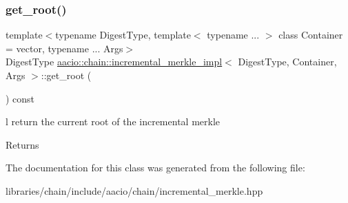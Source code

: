 \subsubsection{\texorpdfstring{get\+\_\+root()}{get\_root()}}
{\footnotesize\ttfamily template$<$typename Digest\+Type, template$<$ typename ... $>$ class Container = vector, typename ... Args$>$ \\
Digest\+Type \mbox{\hyperlink{classaacio_1_1chain_1_1incremental__merkle__impl}{aacio\+::chain\+::incremental\+\_\+merkle\+\_\+impl}}$<$ Digest\+Type, Container, Args $>$\+::get\+\_\+root (\begin{DoxyParamCaption}{ }\end{DoxyParamCaption}) const\hspace{0.3cm}{\ttfamily [inline]}}

l return the current root of the incremental merkle

\begin{DoxyReturn}{Returns}

\end{DoxyReturn}


The documentation for this class was generated from the following file\+:\begin{DoxyCompactItemize}
\item 
libraries/chain/include/aacio/chain/incremental\+\_\+merkle.\+hpp\end{DoxyCompactItemize}
